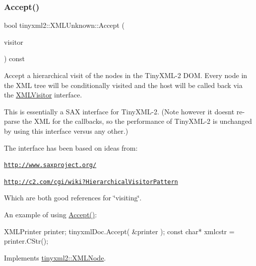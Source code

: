 \subsubsection{\texorpdfstring{Accept()}{Accept()}}
{\footnotesize\ttfamily bool tinyxml2\+::\+X\+M\+L\+Unknown\+::\+Accept (\begin{DoxyParamCaption}\item[{\mbox{\hyperlink{classtinyxml2_1_1_x_m_l_visitor}{X\+M\+L\+Visitor}} $\ast$}]{visitor }\end{DoxyParamCaption}) const\hspace{0.3cm}{\ttfamily [virtual]}}

Accept a hierarchical visit of the nodes in the Tiny\+X\+M\+L-\/2 D\+OM. Every node in the X\+ML tree will be conditionally visited and the host will be called back via the \mbox{\hyperlink{classtinyxml2_1_1_x_m_l_visitor}{X\+M\+L\+Visitor}} interface.

This is essentially a S\+AX interface for Tiny\+X\+M\+L-\/2. (Note however it doesn\textquotesingle{}t re-\/parse the X\+ML for the callbacks, so the performance of Tiny\+X\+M\+L-\/2 is unchanged by using this interface versus any other.)

The interface has been based on ideas from\+:


\begin{DoxyItemize}
\item \href{http://www.saxproject.org/}{\tt http\+://www.\+saxproject.\+org/}
\item \href{http://c2.com/cgi/wiki?HierarchicalVisitorPattern}{\tt http\+://c2.\+com/cgi/wiki?\+Hierarchical\+Visitor\+Pattern}
\end{DoxyItemize}

Which are both good references for \char`\"{}visiting\char`\"{}.

An example of using \mbox{\hyperlink{classtinyxml2_1_1_x_m_l_unknown_a8a06b8c82117ca969a432e17a46830fc}{Accept()}}\+: \begin{DoxyVerb}XMLPrinter printer;
tinyxmlDoc.Accept( &printer );
const char* xmlcstr = printer.CStr();
\end{DoxyVerb}
 

Implements \mbox{\hyperlink{classtinyxml2_1_1_x_m_l_node_a81e66df0a44c67a7af17f3b77a152785}{tinyxml2\+::\+X\+M\+L\+Node}}.

\mbox{\label{classtinyxml2_1_1_x_m_l_unknown_ab73b48b819aa4b2ef3815dc2d7d20d5f}} 
